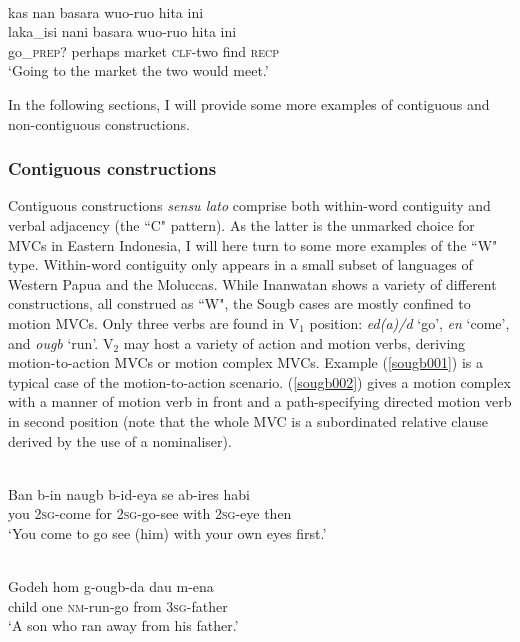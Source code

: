 \ea \label{waimaqa004}
\\
\glll kas nan basara wuo-ruo hita ini \\ 
laka\_isi nani basara wuo-ruo hita ini \\
go\_\textsc{prep?} perhaps market \textsc{clf}-two find \textsc{recp} \\
\glft `Going to the market the two would meet.'\\ 
\z

In the following sections, I will provide some more examples of contiguous and non-contiguous constructions. 

\subsubsection{Contiguous constructions}

Contiguous constructions \textit{sensu lato} comprise both within-word contiguity and verbal adjacency (the ``C" pattern). As the latter is the unmarked choice for MVCs in Eastern Indonesia, I will here turn to some more examples of the ``W" type. Within-word contiguity only appears in a small subset of languages of Western Papua and the Moluccas. While Inanwatan shows a variety of different constructions, all construed as ``W", the Sougb cases are mostly confined to motion MVCs. Only three verbs are found in V$_1$ position: \textit{ed(a)/d} `go', \textit{en} `come', and \textit{ougb} `run'. V$_2$ may host a variety of action and motion verbs, deriving motion-to-action MVCs or motion complex MVCs. Example (\ref{sougb001}) is a typical case of the motion-to-action scenario. (\ref{sougb002}) gives a motion complex with a manner of motion verb in front and a path-specifying directed motion verb in second position (note that the whole MVC is a subordinated relative clause derived by the use of a nominaliser).

\ea \label{sougb001}
\\
\gll Ban b-in naugb b-id-eya se ab-ires habi \\
you 2\textsc{sg}-come for 2\textsc{sg}-go-see with 2\textsc{sg}-eye then \\
\glft `You come to go see (him) with your own eyes first.'\\ 
\z

\ea \label{sougb002}
\\
\gll Godeh hom g-ougb-da dau m-ena \\
child one \textsc{nm}-run-go from 3\textsc{sg}-father \\
\glft `A son who ran away from his father.'\\ 
\z

